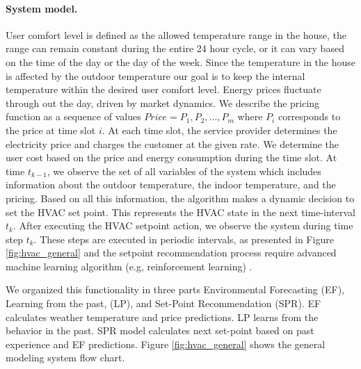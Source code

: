 \paragraph*{System model.}
User comfort level is defined as the allowed temperature range in the house, the range can remain constant during the entire 24 hour cycle, or it can vary based on the time of the day or the day of the week. Since the temperature in the house is affected by the outdoor temperature our goal is to keep the internal temperature within the desired user comfort level. 
Energy prices fluctuate through out the day, driven by market dynamics. We describe the pricing function as a sequence of values $Price = {P_1, P_2, . . . , P_m}$ where $P_i$ corresponds to the price at time slot $i$. At each time slot, the service provider determines the electricity price and charges the customer at the given rate. We determine the user cost based on the price and energy consumption during the time slot. At time $t_{k-1}$, we observe the set of all variables of the system which includes information about the outdoor temperature, the indoor temperature, and the pricing. Based on all this information, the  algorithm makes a dynamic decision to set the HVAC set point. This represents the HVAC state in the next time-interval $t_k$. After executing the HVAC setpoint action, we observe the system during time step $t_k$. These steps are executed in periodic intervals, as presented in Figure \ref{fig:hvac_general} and the setpoint recommendation process require advanced machine learning algorithm (e.g, reinforcement learning) \cite{kotevska2020rl}. %


We organized this functionality in three parts Environmental Forecasting (EF), Learning from the past, (LP), and Set-Point Recommendation (SPR). EF calculates weather temperature and price predictions. LP learns from the behavior in the past. SPR model calculates next set-point based on past experience and EF predictions. Figure \ref{fig:hvac_general} shows the general modeling system flow chart. 



